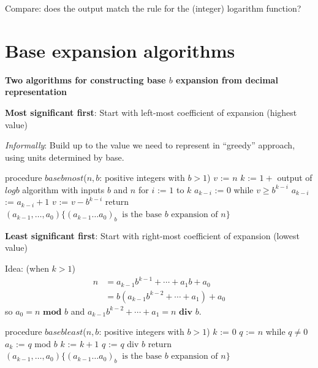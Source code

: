 \documentclass[12pt, oneside]{article}
\begin{document}
\vfill

\vfill

Compare: does the output match the rule for the (integer) logarithm function?


\newpage \vfill
\section*{Base expansion algorithms}


{\bf Two algorithms for constructing base $b$ expansion from decimal representation}

{\bf Most significant first}: Start with left-most coefficient of expansion (highest value)

{\it Informally}: Build up to the value we need to represent in ``greedy'' approach, using 
units determined by base.

\vfill




\begin{algorithm}[caption={Calculating base $b$ expansion, from left}]
procedure $\textit{basebmost}$($n, b$: positive integers with $b > 1$)
$v$ := $n$
$k$ := $1 + $ output of $logb$ algorithm with inputs $b$ and $n$
for $i$ := $1$ to $k$
  $a_{k-i}$ := $0$
  while $v \geq b^{k-i}$
    $a_{k-i}$ := $a_{k-i} + 1$
    $v$ := $v -  b^{k-i}$
return $(a_{k-1}, \ldots, a_0) \{(a_{k-1} \ldots a_0)_b~\textrm{ is the base } b \textrm{ expansion of } n \}$
\end{algorithm}
 


\vfill
\vfill

\newpage
{\bf Least significant first}: Start with right-most coefficient of expansion (lowest value)

Idea: {\tiny(when $k > 1$)} 
    \begin{align*}
      n &= a_{k-1} b^{k-1} + \cdots + a_1 b + a_0 \\
        &= b ( a_{k-1} b^{k-2} + \cdots + a_1) + a_0\end{align*}
    so $a_0 = n \textbf{ mod } b$ and $a_{k-1} b^{k-2} + \cdots + a_1 = n \textbf{ div } b$.




\begin{algorithm}[caption={Calculating base $b$ expansion, from right}]
procedure $\textit{basebleast}$($n, b$: positive integers with $b > 1$)
$k$ := $0$
$q$ := $n$
while $q  \neq 0$
  $a_{k}$ := $q$ mod $b$
  $k$ := $k+1$
  $q$ := $q$ div $b$
return $(a_{k-1}, \ldots, a_0) \{(a_{k-1} \ldots a_0)_b~\textrm{ is the base } b \textrm{ expansion of } n \}$
\end{algorithm}
 
\end{document}
